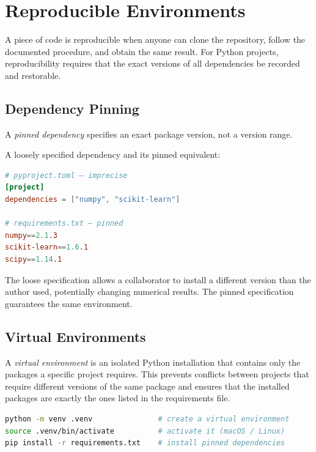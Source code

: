 \section{Reproducible Environments}
\label{section:ReproducibleEnvironments}

A piece of code is reproducible when anyone can clone the repository, follow the documented procedure, and obtain the same result.
For Python projects, reproducibility requires that the exact versions of all dependencies be recorded and restorable.

\subsection{Dependency Pinning}

A \emph{pinned dependency} specifies an exact package version, not a version range.

\begin{example}
A loosely specified dependency and its pinned equivalent:
\begin{lstlisting}[language=toml]
# pyproject.toml — imprecise
[project]
dependencies = ["numpy", "scikit-learn"]

# requirements.txt — pinned
numpy==2.1.3
scikit-learn==1.6.1
scipy==1.14.1
\end{lstlisting}
The loose specification allows a collaborator to install a different version than the author used, potentially changing numerical results.
The pinned specification guarantees the same environment.
\end{example}

\subsection{Virtual Environments}

A \emph{virtual environment} is an isolated Python installation that contains only the packages a specific project requires.
This prevents conflicts between projects that require different versions of the same package and ensures that the installed packages are exactly the ones listed in the requirements file.

\begin{lstlisting}[language=bash]
python -m venv .venv               # create a virtual environment
source .venv/bin/activate          # activate it (macOS / Linux)
pip install -r requirements.txt    # install pinned dependencies
\end{lstlisting}

